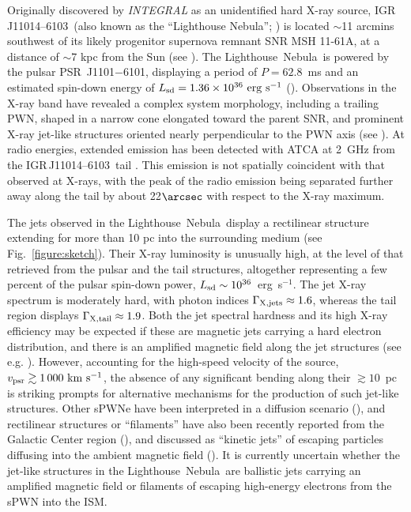 \documentclass[letter]{aa}
\newcommand{\igr}{IGR\,J11014--6103~}
\newcommand{\lneb}{Lighthouse~Nebula~}
\begin{document}



Originally discovered by {\em INTEGRAL} as an unidentified hard X-ray source, \igr (also known as the ``Lighthouse Nebula''; \citealp{Pavan2014}) is located $\sim$11 arcmins southwest of its likely progenitor supernova remnant SNR MSH 11-61A, at a distance of $\sim$7 kpc from the Sun (see \citealp{Garcia2012}). The \lneb is powered by the pulsar PSR~J1101$-$6101, displaying a period of $P = 62.8$~ms and an estimated spin-down energy of $L_{\rm sd} = 1.36 \times 10^{36}~\mathrm{erg\ s^{-1}}$ (\citealp{Halpern2014}). Observations in the X-ray band have revealed a complex system morphology, including a trailing PWN, shaped in a narrow cone elongated toward the parent SNR, and prominent X-ray jet-like structures oriented nearly perpendicular to the PWN axis (see \citealp{Pavan2016}). At radio energies, extended emission has been detected with ATCA at 2~GHz from the \igr tail \citep{Pavan2014}. This emission is not spatially coincident with that observed at X-rays, with the peak of the radio emission being separated further away along the tail by about 22$\arcsec$ with respect to the X-ray maximum.

The jets observed in the \lneb  display a rectilinear structure extending for more than 10 pc into the surrounding medium (see Fig.~\ref{figure:sketch}). Their X-ray luminosity is unusually high, at the level of that retrieved from the pulsar and the tail structures, altogether representing a few percent of the pulsar spin-down power, $L_{\rm sd} \sim 10^{36}$~erg~s$^{-1}$. The jet X-ray spectrum is moderately hard, with photon indices $\Gamma_{\rm X, jets} \approx 1.6$, whereas the tail region displays $\Gamma_{\rm X, tail} \approx 1.9$. Both the jet spectral hardness and its high X-ray efficiency may be expected if these are magnetic jets carrying a hard electron distribution, and there is an amplified magnetic field along the jet structures (see e.g. \citealp{Bykov2017}). However, accounting for the high-speed velocity of the source, $v_{\rm psr} \gtrsim 1\,000~\mathrm{km~s^{-1}}$, the absence of any significant bending along their $\gtrsim 10$~pc is striking prompts for alternative mechanisms for the production of such jet-like structures. Other sPWNe have been interpreted in a diffusion scenario (\citealp{Bandiera2008}), and rectilinear structures or ``filaments'' have also been recently reported from the Galactic Center region (\citealp{MeerKAT2018}), and discussed as ``kinetic jets'' of escaping particles diffusing into the ambient magnetic field (\citealp{Barkov2019b}). It is currently uncertain whether the jet-like structures in the \lneb are ballistic jets carrying an amplified magnetic field or filaments of escaping high-energy electrons from the sPWN into the ISM.
\end{document}
